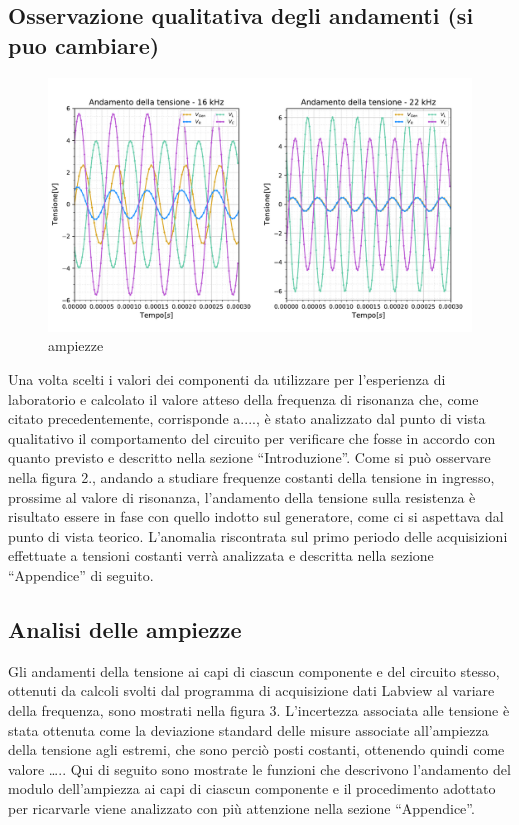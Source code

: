\subsection{Osservazione qualitativa degli andamenti (si puo cambiare)}

\begin{figure}[h]
    \centering
    \includegraphics[width=1\textwidth]{../figs/tensione-tempo.pdf}
    \caption{ampiezze}\label{fig:tensione-tempo}
\end{figure}

Una volta scelti i valori dei componenti da utilizzare per l’esperienza di laboratorio e calcolato il valore atteso della
frequenza di risonanza che, come citato precedentemente, corrisponde a...., è stato analizzato dal punto di vista qualitativo il comportamento del circuito per verificare che fosse in accordo con quanto previsto e descritto nella sezione “Introduzione”.
Come si può osservare nella figura 2., andando a studiare frequenze costanti della tensione in ingresso, prossime al valore di risonanza, l’andamento della tensione sulla resistenza è risultato essere in fase con quello indotto sul generatore, come ci si aspettava dal punto di vista teorico.
L’anomalia riscontrata sul primo periodo delle acquisizioni effettuate a tensioni costanti verrà analizzata e descritta nella sezione “Appendice” di seguito.

\subsection{Analisi delle ampiezze}

Gli andamenti della tensione ai capi di ciascun componente e del circuito stesso, ottenuti da calcoli svolti dal programma di acquisizione dati Labview al variare della frequenza, sono mostrati nella figura 3.
L’incertezza associata alle tensione è stata ottenuta come la deviazione standard delle misure associate all’ampiezza della tensione agli estremi, che sono perciò posti costanti, ottenendo quindi come valore …..
Qui di seguito sono mostrate le funzioni che descrivono l’andamento del modulo dell’ampiezza ai capi di ciascun componente e il procedimento adottato per ricarvarle viene analizzato con più attenzione nella sezione “Appendice”.

